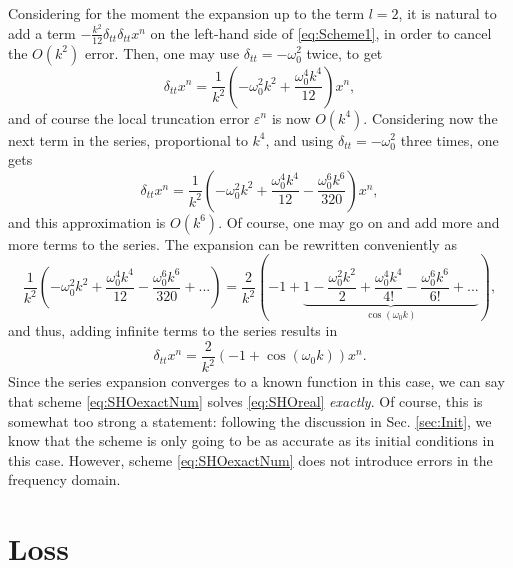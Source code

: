 \documentclass[11pt,twoside,a4paper,english]{book}
\newcommand{\dtt}{\delta_{tt}}
\begin{document}
Considering for the moment the expansion up to the term $l=2$, it is natural to add a term $-\frac{k^2}{12}\dtt \dtt x^n$ on the left-hand side of \eqref{eq:Scheme1}, in order to cancel the $O(k^2)$ error. Then, one may use $\dtt = -\omega_0^2$ twice, to get 
\begin{equation}
    \dtt x^n = \frac{1}{k^2}\left(-\omega_0^2k^2 + \frac{\omega_0^4 k^4}{12} \right) x^n,
\end{equation}
and of course the local truncation error $\varepsilon^n$ is now $O(k^4)$. Considering now the next term in the series, proportional to $k^4$, and using $\dtt = -\omega_0^2$ three times, one gets
\begin{equation}
    \dtt x^n = \frac{1}{k^2}\left(-\omega_0^2k^2 + \frac{\omega_0^4 k^4}{12} - \frac{\omega_0^6k^6}{320}\right) x^n,
\end{equation}
and this approximation is $O(k^6)$. Of course, one may go on and add more and more terms to the series. The expansion can be rewritten conveniently as
\begin{equation}
    \frac{1}{k^2}\left(-\omega_0^2k^2 + \frac{\omega_0^4 k^4}{12} - \frac{\omega_0^6 k^6}{320} + ...\right) = \frac{2}{k^2}\left(-1 + \underbrace{1 - \frac{\omega_0^2k^2}{2} + \frac{\omega_0^4k^4}{4!} - \frac{\omega_0^6k^6}{6!} + ...}_{\cos(\omega_0k)} \right),
\end{equation}
and thus, adding infinite terms to the series results in
\begin{equation}\label{eq:SHOexactNum}
    \dtt x^n =  \frac{2}{k^2}\left(-1 + \cos(\omega_0 k) \right)x^n.
\end{equation}
Since the series expansion converges to a known function in this case, we can say that scheme \eqref{eq:SHOexactNum} solves \eqref{eq:SHOreal} \emph{exactly}. Of course, this is somewhat too strong a statement: following the discussion in Sec. \ref{sec:Init}, we know that the scheme is only going to be as accurate as its initial conditions in this case. However, scheme \eqref{eq:SHOexactNum} does not introduce errors in the frequency domain. 


\section{Loss}\label{sec:LossSHO}
\end{document}
